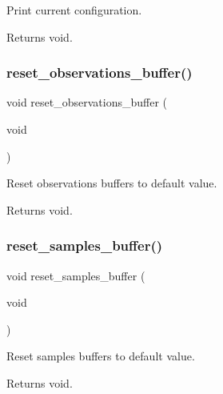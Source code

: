 Print current configuration. 

\begin{DoxyReturn}{Returns}
void. 
\end{DoxyReturn}
\mbox{\label{i2c-th_8h_a49fdbb850fac1a3832e7852a24c31c72}} 
\subsubsection{\texorpdfstring{reset\+\_\+observations\+\_\+buffer()}{reset\_observations\_buffer()}}
{\footnotesize\ttfamily void reset\+\_\+observations\+\_\+buffer (\begin{DoxyParamCaption}\item[{void}]{ }\end{DoxyParamCaption})}



Reset observations buffers to default value. 

\begin{DoxyReturn}{Returns}
void. 
\end{DoxyReturn}
\mbox{\label{i2c-th_8h_a5f6b7d25ff64c2ddaa0fadd3058fcee3}} 
\subsubsection{\texorpdfstring{reset\+\_\+samples\+\_\+buffer()}{reset\_samples\_buffer()}}
{\footnotesize\ttfamily void reset\+\_\+samples\+\_\+buffer (\begin{DoxyParamCaption}\item[{void}]{ }\end{DoxyParamCaption})}



Reset samples buffers to default value. 

\begin{DoxyReturn}{Returns}
void. 
\end{DoxyReturn}
\mbox{\label{i2c-th_8h_aba0fc91d6c2829df00a9d5fe2b921c90}} 
